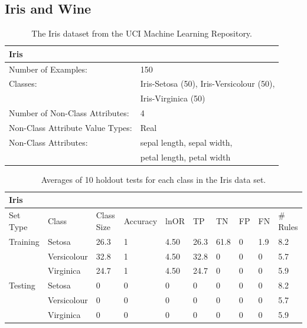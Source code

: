 \documentclass[11pt]{article}
\begin{document}
\subsection{Iris and Wine}
\begin{table}
\begin{tabularx}{\textwidth}{ll}
\toprule
\textbf{Iris} & \\
\midrule
Number of Examples: & 150 \\
Classes: & Iris-Setosa (50), Iris-Versicolour (50), \\
& Iris-Virginica (50) \\
Number of Non-Class Attributes: & 4 \\
Non-Class Attribute Value Types: & Real \\
Non-Class Attributes: & sepal length, sepal width, \\
& petal length, petal width \\
\bottomrule
\end{tabularx}
\caption{The Iris dataset from the UCI Machine Learning Repository.}
\label{iris_info}
\end{table}
\begin{table}
\centering
\begin{tabular}{llllllllll}
\toprule
\textbf{Iris} & & & & & & & & & \\
\midrule
Set Type & Class & Class Size & Accuracy & lnOR & TP & TN & FP & FN & \# Rules \\
\midrule
Training & Setosa & 26.3 & 1 & 4.50 & 26.3 & 61.8 & 0 & 1.9 & 8.2 \\
& Versicolour & 32.8 & 1 & 4.50 & 32.8 & 0 & 0 & 0 & 5.7 \\
& Virginica & 24.7 & 1 & 4.50 & 24.7 & 0 & 0 & 0 & 5.9 \\
Testing & Setosa & 0 & 0 & 0 & 0 & 0 & 0 & 0 & 8.2 \\
& Versicolour & 0 & 0 & 0 & 0 & 0 & 0 & 0 & 5.7 \\
& Virginica & 0 & 0 & 0 & 0 & 0 & 0 & 0 & 5.9 \\
\bottomrule
\end{tabular}
\caption{Averages of 10 holdout tests for each class in the Iris data set.}
\label{iris_results}
\end{table}
\end{document}
